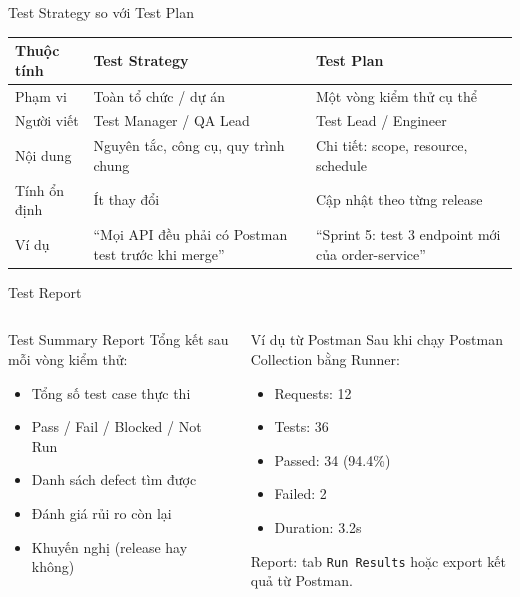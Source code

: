 \documentclass[aspectratio=169,12pt]{beamer}
\begin{document}
\begin{frame}[shrink=10]{Test Strategy so với Test Plan}
  \begin{center}
  \begin{tabular}{p{2.5cm}p{4cm}p{4cm}}
    \toprule
    \textbf{Thuộc tính} & \textbf{Test Strategy} & \textbf{Test Plan} \\
    \midrule
    Phạm vi    & Toàn tổ chức / dự án    & Một vòng kiểm thử cụ thể \\
    Người viết & Test Manager / QA Lead  & Test Lead / Engineer \\
    Nội dung   & Nguyên tắc, công cụ, quy trình chung & Chi tiết: scope, resource, schedule \\
    Tính ổn định & Ít thay đổi            & Cập nhật theo từng release \\
    Ví dụ      & ``Mọi API đều phải có Postman test trước khi merge'' & ``Sprint 5: test 3 endpoint mới của order-service'' \\
    \bottomrule
  \end{tabular}
  \end{center}
\end{frame}

\begin{frame}{Test Report}
  \begin{columns}
    \begin{block}{Test Summary Report}
      Tổng kết sau mỗi vòng kiểm thử:
      \begin{itemize}
        \item Tổng số test case thực thi
        \item Pass / Fail / Blocked / Not Run
        \item Danh sách defect tìm được
        \item Đánh giá rủi ro còn lại
        \item Khuyến nghị (release hay không)
      \end{itemize}
    \end{block}

    \begin{exampleblock}{Ví dụ từ Postman}
      Sau khi chạy Postman Collection bằng Runner:
      \begin{itemize}
        \item Requests: 12
        \item Tests: 36
        \item Passed: 34 (94.4\%)
        \item Failed: 2
        \item Duration: 3.2s
      \end{itemize}
      Report: tab \texttt{Run Results} hoặc export kết quả từ Postman.
    \end{exampleblock}
  \end{columns}
\end{frame}
\end{document}
